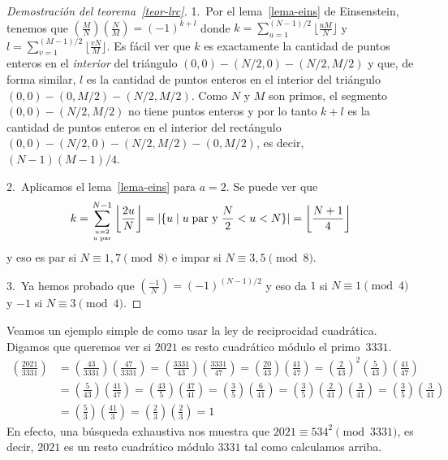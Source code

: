 \documentclass[a4paper, 11pt]{article}
\theoremstyle{plain}
\theoremstyle{definition}
\newcommand\myatop[2]{\genfrac{}{}{0pt}{}{#1}{#2}}
\begin{document}
\begin{proof}[Demostración del teorema~\ref{teor-lrc}]
1.~Por el lema~\ref{lema-eins} de Einsenstein, tenemos que
$\left(\frac{M}{N}\right)\left(\frac{N}{M}\right)=(-1)^{k+l}$ donde
$k=\sum_{u=1}^{(N-1)/2}\lfloor\frac{uM}{N}\rfloor$ y
$l=\sum_{v=1}^{(M-1)/2}\lfloor\frac{vN}{M}\rfloor$. Es fácil ver que
$k$ es exactamente la cantidad de puntos enteros en el \emph{interior}
del triángulo $(0,0)-(N/2,0)-(N/2,M/2)$ y que, de forma similar,
$l$ es la cantidad de puntos enteros en el interior del triángulo
$(0,0)-(0,M/2)-(N/2,M/2)$. Como $N$ y $M$ son primos, el segmento
$(0,0)-(N/2,M/2)$ no tiene puntos enteros y por lo tanto $k+l$ es la
cantidad de puntos enteros en el interior del rectángulo $(0,0)-(N/2,0)-
(N/2,M/2)-(0,M/2)$, es decir, $(N-1)(M-1)/4$.

2.~Aplicamos el lema~\ref{lema-eins} para $a=2$. Se puede ver que
\[
   k=\sum_{\myatop{u=2}{u\;\text{par}}}^{N-1}\left\lfloor\frac{2u}{N}\right\rfloor=
   |\{u\mid u\;\text{par y}\;\frac{N}{2}<u<N\}|=
   \left\lfloor\frac{N+1}{4}\right\rfloor
\]
y eso es par si $N\equiv1,7\pmod{8}$ e impar si $N\equiv3,5\pmod{8}$.

3.~Ya hemos probado que $\left(\frac{-1}{N}\right)=(-1)^{(N-1)/2}$ y eso
da $1$ si $N\equiv1\pmod{4}$ y $-1$ si $N\equiv3\pmod{4}$.
\end{proof}

Veamos un ejemplo simple de como usar la ley de reciprocidad cuadrática.
Digamos que queremos ver si $2021$ es resto cuadrático módulo el primo~$3331$.
\[
\begin{aligned}
\left(\frac{2021}{3331}\right)&=\left(\frac{43}{3331}\right)\left(\frac{47}{3331}
\right)=\left(\frac{3331}{43}\right)\left(\frac{3331}{47}\right)=\left(\frac{20}{43}
\right)\left(\frac{41}{47}\right)=\left(\frac{2}{43}\right)^2\left(\frac{5}{43}
\right)\left(\frac{41}{47}\right)\\
&=\left(\frac{5}{43}\right)\left(\frac{41}{47}\right)=\left(\frac{43}{5}\right)
\left(\frac{47}{41}\right)=\left(\frac{3}{5}\right)\left(\frac{6}{41}\right)=
\left(\frac{3}{5}\right)\left(\frac2{41}\right)\left(\frac3{41}\right)=
\left(\frac{3}{5}\right)\left(\frac3{41}\right)\\
&=\left(\frac{5}{3}\right)\left(\frac{41}{3}\right)=
\left(\frac{2}{3}\right)\left(\frac{2}{3}\right)=1
\end{aligned}
\]
En efecto, una búsqueda exhaustiva nos muestra que $2021\equiv 534^2\pmod{3331}$,
es decir, $2021$ es un resto cuadrático módulo $3331$ tal como calculamos arriba.
\end{document}
